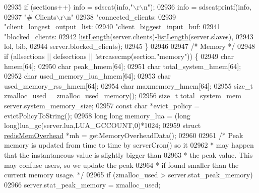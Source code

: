 \begin{DoxyCode}
{{{{{{{{{{{{{{{{{{{{{{{{{{{{{{{{{{{{{{{{{{{{{{{{{{{{{{{{{{{{02935         \textcolor{keywordflow}{if} (sections++) info = sdscat(info,\textcolor{stringliteral}{"\(\backslash\)r\(\backslash\)n"});
02936         info = sdscatprintf(info,
02937             \textcolor{stringliteral}{"# Clients\(\backslash\)r\(\backslash\)n"}
02938             \textcolor{stringliteral}{"connected\_clients:%
02939             \textcolor{stringliteral}{"client\_longest\_output\_list:%
02940             \textcolor{stringliteral}{"client\_biggest\_input\_buf:%
02941             \textcolor{stringliteral}{"blocked\_clients:%
02942             \hyperlink{adlist_8h_afde0ab079f934670e82119b43120e94b}{listLength}(server.clients)-\hyperlink{adlist_8h_afde0ab079f934670e82119b43120e94b}{listLength}(server.slaves),
02943             lol, bib,
02944             server.blocked\_clients);
02945     \}
02946 
02947     \textcolor{comment}{/* Memory */}
02948     \textcolor{keywordflow}{if} (allsections || defsections || !strcasecmp(section,\textcolor{stringliteral}{"memory"})) \{
02949         \textcolor{keywordtype}{char} hmem[64];
02950         \textcolor{keywordtype}{char} peak\_hmem[64];
02951         \textcolor{keywordtype}{char} total\_system\_hmem[64];
02952         \textcolor{keywordtype}{char} used\_memory\_lua\_hmem[64];
02953         \textcolor{keywordtype}{char} used\_memory\_rss\_hmem[64];
02954         \textcolor{keywordtype}{char} maxmemory\_hmem[64];
02955         size\_t zmalloc\_used = zmalloc\_used\_memory();
02956         size\_t total\_system\_mem = server.system\_memory\_size;
02957         \textcolor{keyword}{const} \textcolor{keywordtype}{char} *evict\_policy = evictPolicyToString();
02958         \textcolor{keywordtype}{long} \textcolor{keywordtype}{long} memory\_lua = (\textcolor{keywordtype}{long} \textcolor{keywordtype}{long})lua\_gc(server.lua,LUA\_GCCOUNT,0)*1024;
02959         \textcolor{keyword}{struct} \hyperlink{structredisMemOverhead}{redisMemOverhead} *mh = getMemoryOverheadData();
02960 
02961         \textcolor{comment}{/* Peak memory is updated from time to time by serverCron() so it}
02962 \textcolor{comment}{         * may happen that the instantaneous value is slightly bigger than}
02963 \textcolor{comment}{         * the peak value. This may confuse users, so we update the peak}
02964 \textcolor{comment}{         * if found smaller than the current memory usage. */}
02965         \textcolor{keywordflow}{if} (zmalloc\_used > server.stat\_peak\_memory)
02966             server.stat\_peak\_memory = zmalloc\_used;
}}}}}}}}}}}}}}}}}}}}}}}}}}}}}}}}}}}}}}}}}}}}}}}}}}}}}}}}}}}}}}}}
\end{DoxyCode}
